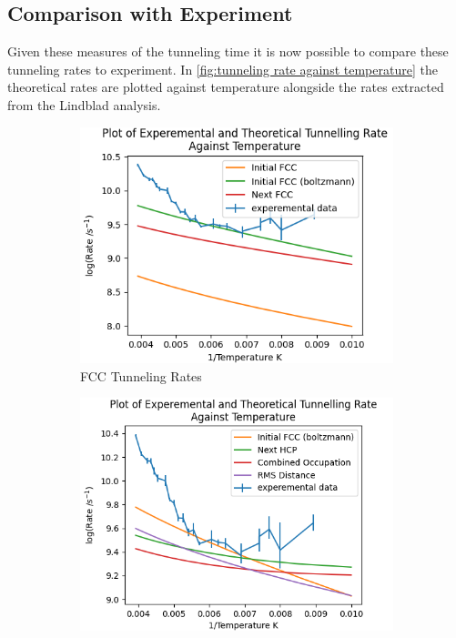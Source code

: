 \subsection{Comparison with Experiment}
Given these measures of the
tunneling time it is now possible to compare
these tunneling rates to experiment.
In \cref{fig:tunneling rate against temperature}
the theoretical rates
are plotted against temperature
alongside the rates extracted
from the Lindblad analysis.
\begin{figure}[htbp]
    \centering
    \begin{subfigure}{0.45\linewidth}
        \centering
        \includegraphics[width =0.9 \linewidth]{Figures/Redfield/Plot of redfield temperature dependance FCC points.png}
        \caption{FCC Tunneling Rates
        }\label{sub@fig:fcc tunneling rates temp dependence}
    \end{subfigure}
    \hfill
    \begin{subfigure}{0.45\linewidth}
        \centering
        \includegraphics[width = 0.9\linewidth]{Figures/Redfield/Plot of redfield temperature dependance close points.png}

\end{subfigure}
\end{figure}
